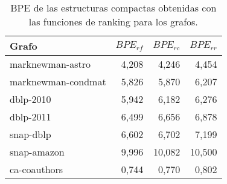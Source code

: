 \begin{table}
	\caption{BPE de las estructuras compactas obtenidas con las funciones de ranking para los grafos.}
	\label{table:bpeRanking}
	\centering
	\begin{tabular}{l|r|r|r}
		\toprule
		Grafo & $BPE_{rf}$ & $BPE_{rc}$ & $BPE_{rr}$ \\
		\midrule
		marknewman-astro & 4,208 & 4,246 & 4,454 \\
		marknewman-condmat & 5,826 & 5,870 & 6,207 \\
		dblp-2010 & 5,942 & 6,182 & 6,276 \\
		dblp-2011 & 6,499 & 6,656 & 6,878 \\
		snap-dblp & 6,602 & 6,702 & 7,199 \\
		snap-amazon & 9,996 & 10,082 & 10,500 \\
		ca-coauthors & 0,744 & 0,770 & 0,802 \\
         \bottomrule
	\end{tabular}
\end{table}
 